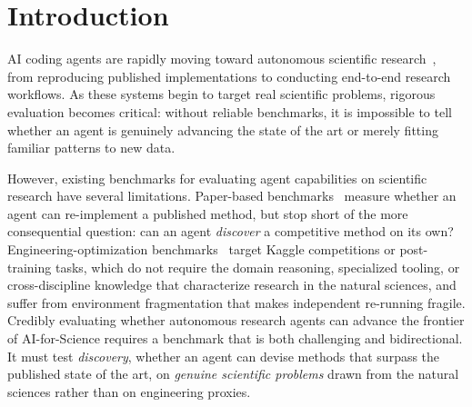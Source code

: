 \section{Introduction}
\label{sec:intro}

AI coding agents are rapidly moving toward autonomous scientific research~\citep{karpathy2026autoresearch,lu2026towards,gottweis2026accelerating}, from reproducing published implementations to conducting end-to-end research workflows.
As these systems begin to target real scientific problems, rigorous evaluation becomes critical: without reliable benchmarks, it is impossible to tell whether an agent is genuinely advancing the state of the art or merely fitting familiar patterns to new data.

However, existing benchmarks for evaluating agent capabilities on scientific research have several limitations.
Paper-based benchmarks~\citep{starace2025paperbench,siegel2024corebench,wang2026firebench} measure whether an agent can re-implement a published method, but stop short of the more consequential question: can an agent \emph{discover} a competitive method on its own?
Engineering-optimization benchmarks~\citep{shern2024mlebench,rank2026posttrainbench,nathani2025mlgym,qiang2026mle} target Kaggle competitions or post-training tasks, which do not require the domain reasoning, specialized tooling, or cross-discipline knowledge that characterize research in the natural sciences, and suffer from environment fragmentation that makes independent re-running fragile.
Credibly evaluating whether autonomous research agents can advance the frontier of AI-for-Science requires a benchmark that is both challenging and bidirectional. It must test \emph{discovery}, whether an agent can devise methods that surpass the published state of the art, on \emph{genuine scientific problems} drawn from the natural sciences rather than on engineering proxies.

